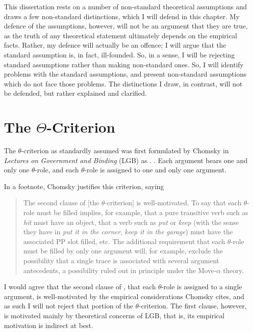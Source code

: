This dissertation rests on a number of non-standard theoretical assumptions and draws a few non-standard distinctions, which I will defend in this chapter.
My defence of the assumptions, however, will not be an argument that they are true, as the truth of any theoretical statement ultimately depends on the empirical facts.
Rather, my defence will actually be an offence; I will argue that the standard assumption is, in fact, ill-founded.
So, in a sense, I will be rejecting standard assumptions rather than making non-standard ones.
So, I will identify problems with the standard assumptions, and present non-standard assumptions which do not face those problems.
The distinctions I draw, in contrast, will not be defended, but rather explained and clarified.

\section{The $\Theta$-Criterion}\label{sec:theta-crit}
The $\theta$-criterion as standardly assumed was first formulated by Chomsky in \textit{Lectures on Government and Binding} (LGB) as \Next.
\ex. Each argument bears one and only one $\theta$-role, and each $\theta$-role is assigned to one and only one argument. \parencite[36]{chomsky1981lectures}

In a footnote, Chomsky justifies this criterion, saying 
\begin{quote}
	The second clause of [the $\theta$-criterion] is well-motivated.
	To say that each $\theta$-role must be filled implies, for example, that a pure transitive verb such as \textit{hit} must have an object, that a verb such as \textit{put} or \textit{keep} (with the sense they have in \textit{put it in the corner}, \textit{keep it in the garage}) must have the associated PP slot filled, etc. 
	The additional requirement that each $\theta$-role must be filled by only one argument will, for example, exclude the possibility that a single trace is associated with several argument antecedents, a possibility ruled out in principle under the Move-$\alpha$ theory. 
	\parencite[139]{chomsky1981lectures}
\end{quote}
I would agree that the second clause of \Last, that each $\theta$-role is assigned to a single argument, is well-motivated by the empirical considerations Chomsky cites, and as such I will not reject that portion of the $\theta$-criterion.
The first clause, however, is motivated mainly by theoretical concerns of LGB, that is, its empirical motivation is indirect at best.

